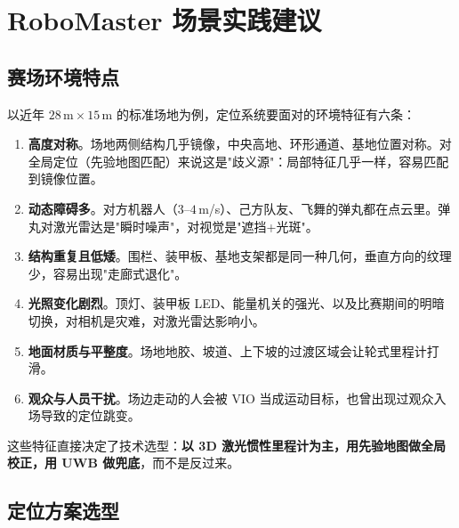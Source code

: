 \chapter{RoboMaster 场景实践建议}\label{ch:29-rm}
\usetikzlibrary{arrows.meta}


\section{赛场环境特点}\label{sec:29-env}

以近年 $28\,\mathrm{m}\times15\,\mathrm{m}$ 的标准场地为例，定位系统要面对的环境特征有六条：

\begin{enumerate}
  \item \textbf{高度对称}。场地两侧结构几乎镜像，中央高地、环形通道、基地位置对称。对全局定位（先验地图匹配）来说这是"歧义源"：局部特征几乎一样，容易匹配到镜像位置。
  \item \textbf{动态障碍多}。对方机器人（$3$--$4$\,m/s）、己方队友、飞舞的弹丸都在点云里。弹丸对激光雷达是"瞬时噪声"，对视觉是"遮挡+光斑"。
  \item \textbf{结构重复且低矮}。围栏、装甲板、基地支架都是同一种几何，垂直方向的纹理少，容易出现"走廊式退化"。
  \item \textbf{光照变化剧烈}。顶灯、装甲板 LED、能量机关的强光、以及比赛期间的明暗切换，对相机是灾难，对激光雷达影响小。
  \item \textbf{地面材质与平整度}。场地地胶、坡道、上下坡的过渡区域会让轮式里程计打滑。
  \item \textbf{观众与人员干扰}。场边走动的人会被 VIO 当成运动目标，也曾出现过观众入场导致的定位跳变。
\end{enumerate}

这些特征直接决定了技术选型：\textbf{以 3D 激光惯性里程计为主，用先验地图做全局校正，用 UWB 做兜底}，而不是反过来。

\section{定位方案选型}\label{sec:29-scheme}

